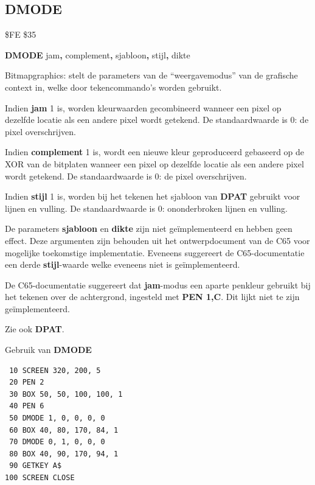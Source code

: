
\newpage
\subsection{DMODE}
\begin{description}[leftmargin=2cm,style=nextline]
\item [Token:]    \$FE \$35
\item [Formaat:]   {\bf DMODE} jam{\bf,} complement{\bf,} sjabloon{\bf,} stijl{\bf,} dikte\item [Gebruik:]    Bitmapgraphics: stelt de parameters van de ``weergavemodus'' van de grafische context in, welke door tekencommando's worden gebruikt.

                  Indien {\bf jam} 1 is, worden kleurwaarden gecombineerd wanneer een pixel op dezelfde locatie als een andere pixel wordt getekend. De standaardwaarde is 0: de pixel overschrijven.

                  Indien {\bf complement} 1 is, wordt een nieuwe kleur geproduceerd gebaseerd op de XOR van de bitplaten wanneer een pixel op dezelfde locatie als een andere pixel wordt getekend. De standaardwaarde is 0: de pixel overschrijven.

                  Indien {\bf stijl} 1 is, worden bij het tekenen het sjabloon van {\bf DPAT} gebruikt voor lijnen en vulling. De standaardwaarde is 0: ononderbroken lijnen en vulling.

\item[Opmerkingen:]   De parameters {\bf sjabloon} en {\bf dikte} zijn niet geïmplementeerd en hebben geen effect. Deze argumenten zijn behouden uit het ontwerpdocument van de C65 voor mogelijke toekomstige implementatie. Eveneens suggereert de C65-documentatie een derde {\bf stijl}-waarde welke eveneens niet is geïmplementeerd.

                  De C65-documentatie suggereert dat {\bf jam}-modus een aparte penkleur gebruikt bij het tekenen over de achtergrond, ingesteld met {\bf PEN 1,C}. Dit lijkt niet te zijn geïmplementeerd.

                  Zie ook {\bf DPAT}.

\item [Voorbeeld:]  Gebruik van {\bf DMODE}

\begin{tcolorbox}[colback=black,coltext=white]
\verbatimfont{\codefont}
\begin{verbatim}
 10 SCREEN 320, 200, 5
 20 PEN 2
 30 BOX 50, 50, 100, 100, 1
 40 PEN 6
 50 DMODE 1, 0, 0, 0, 0
 60 BOX 40, 80, 170, 84, 1
 70 DMODE 0, 1, 0, 0, 0
 80 BOX 40, 90, 170, 94, 1
 90 GETKEY A$
100 SCREEN CLOSE
\end{verbatim}
\end{tcolorbox}
\end{description}

